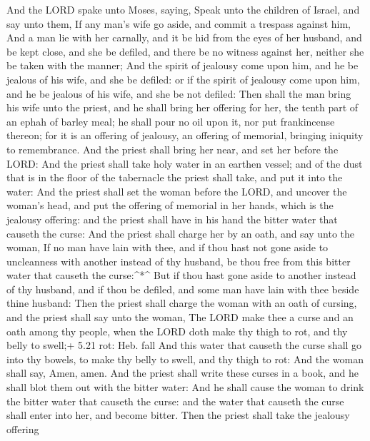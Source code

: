  And the LORD spake unto Moses, saying,  Speak
unto the children of Israel, and say unto them, If any man's wife go
aside, and commit a trespass against him,  And a man lie
with her carnally, and it be hid from the eyes of her husband, and be
kept close, and she be defiled, and there be no witness against her,
neither she be taken with the manner;  And the spirit of
jealousy come upon him, and he be jealous of his wife, and she be
defiled: or if the spirit of jealousy come upon him, and he be jealous
of his wife, and she be not defiled:  Then shall the man
bring his wife unto the priest, and he shall bring her offering for her,
the tenth part of an ephah of barley meal; he shall pour no oil upon it,
nor put frankincense thereon; for it is an offering of jealousy, an
offering of memorial, bringing iniquity to remembrance. 
And the priest shall bring her near, and set her before the LORD:
 And the priest shall take holy water in an earthen vessel;
and of the dust that is in the floor of the tabernacle the priest shall
take, and put it into the water:  And the priest shall set
the woman before the LORD, and uncover the woman's head, and put the
offering of memorial in her hands, which is the jealousy offering: and
the priest shall have in his hand the bitter water that causeth the
curse:  And the priest shall charge her by an oath, and say
unto the woman, If no man have lain with thee, and if thou hast not gone
aside to uncleanness with another instead of thy husband, be thou free
from this bitter water that causeth the curse:\^{}*\^{} 
But if thou hast gone aside to another instead of thy husband, and if
thou be defiled, and some man have lain with thee beside thine husband:
 Then the priest shall charge the woman with an oath of
cursing, and the priest shall say unto the woman, The LORD make thee a
curse and an oath among thy people, when the LORD doth make thy thigh to
rot, and thy belly to swell;+ 5.21 rot: Heb. fall  And this
water that causeth the curse shall go into thy bowels, to make thy belly
to swell, and thy thigh to rot: And the woman shall say, Amen, amen.
 And the priest shall write these curses in a book, and he
shall blot them out with the bitter water:  And he shall
cause the woman to drink the bitter water that causeth the curse: and
the water that causeth the curse shall enter into her, and become
bitter.  Then the priest shall take the jealousy offering
